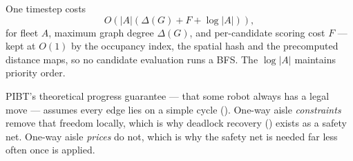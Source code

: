 One timestep costs
\begin{equation}
  O\!\left(|A|\left(\Delta(G) + F + \log|A|\right)\right),
\end{equation}
for fleet $A$, maximum graph degree $\Delta(G)$, and per-candidate scoring cost
$F$ --- kept at $O(1)$ by the occupancy index, the spatial hash and the
precomputed distance maps, so no candidate evaluation runs a BFS. The
$\log|A|$ maintains priority order.

PIBT's theoretical progress guarantee --- that some robot always has a legal
move --- assumes every edge lies on a simple cycle
(). One-way aisle \emph{constraints} remove that
freedom locally, which is why deadlock recovery () exists as
a safety net. One-way aisle \emph{prices} do not, which is why the safety net
is needed far less often once  is applied.
